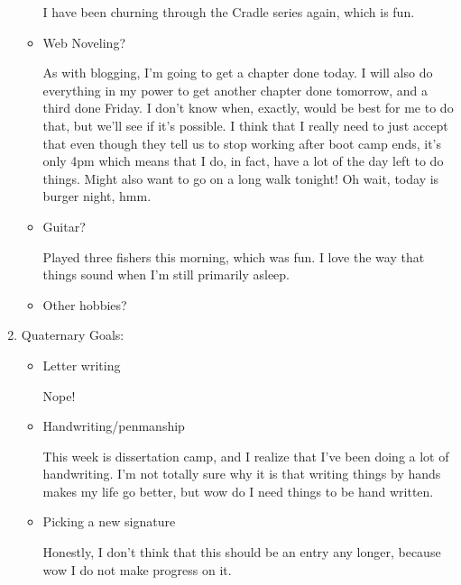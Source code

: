 \documentclass[12pt]{article}
\renewcommand{\,}{\textsuperscript{,}}
\begin{document}
\begin{enumerate}
\begin{itemize}
I have been churning through the Cradle series again, which is fun.

\item Web Noveling?

As with blogging, I'm going to get a chapter done today.  
I will also do everything in my power to get another chapter done tomorrow, and a third done Friday.  
I don't know when, exactly, would be best for me to do that, but we'll see if it's possible.  
I think that I really need to just accept that even though they tell us to stop working after boot camp ends, it's only 4pm which means that I do, in fact, have a lot of the day left to do things.  
Might also want to go on a long walk tonight!  
Oh wait, today is burger night, hmm.

\item Guitar?

Played three fishers this morning, which was fun.  
I love the way that things sound when I'm still primarily asleep.

\item Other hobbies?

\end{itemize}

\item Quaternary Goals:

\begin{itemize}

\item Letter writing

Nope!

\item Handwriting/penmanship

This week is dissertation camp, and I realize that I've been doing a lot of handwriting.  
I'm not totally sure why it is that writing things by hands makes my life go better, but wow do I need things to be hand written.

\item Picking a new signature

Honestly, I don't think that this should be an entry any longer, because wow I do not make progress on it.

\end{itemize}

\end{enumerate}
\end{document}
